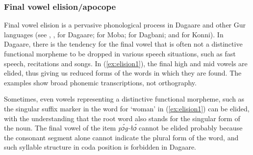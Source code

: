 \subsubsection{Final vowel elision/apocope}
Final vowel elision is a pervasive phonological process in Dagaare and other Gur languages (see \citealt{Kennedy1966}, \citealt{AnttilaBodomo1996}, \citealt{Bodomo1997} for Dagaare; \citealt{Rialland1985} for Moba; \citealt{Hyman1993} for Dagbani; and \citealt{Cahill1999} for Konni). In Dagaare,
there is the tendency for the final vowel that is often not a distinctive functional morpheme to
be dropped in various speech situations, such as fast speech, recitations and songs. In (\ref{ex:elision1}),
the final high and mid vowels are elided, thus giving us reduced forms of the words in which
they are found. The examples show broad phonemic transcriptions, not orthography.





Sometimes, even vowels representing a distinctive functional morpheme, such as the singular
suffix marker in the word for `woman' in (\ref{ex:elision1}) can be elided, with the understanding that the
root word also stands for the singular form of the noun. The final vowel of the item \textit{pɔ́g-bɔ́}
cannot be elided probably because the consonant segment alone cannot indicate the plural
form of the word, and such syllable structure in coda position is forbidden in Dagaare.


